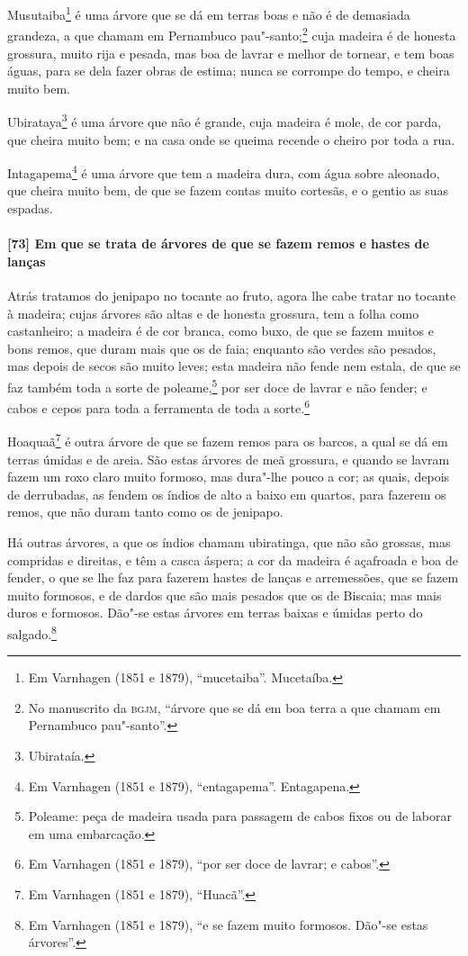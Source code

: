 Musutaiba\footnote{ Em Varnhagen (1851 e 1879), ``mucetaiba''. Mucetaíba.} é uma árvore
que se dá em terras boas e não é de demasiada grandeza, a que chamam em Pernambuco
pau"-santo;\footnote{ No manuscrito da \textsc{bgjm}, ``árvore que se dá em boa terra a que
chamam em Pernambuco pau"-santo''.} cuja madeira é de honesta grossura, muito rija e
pesada, mas boa de lavrar e melhor de tornear, e tem boas águas, para se dela fazer obras
de estima; nunca se corrompe do tempo, e cheira muito bem.

Ubirataya\footnote{ Ubirataía.} é uma árvore que não é grande, cuja madeira é mole, de cor
parda, que cheira muito bem; e na casa onde se queima recende o cheiro por toda a rua.

Intagapema\footnote{ Em Varnhagen (1851 e 1879), ``entagapema''. Entagapena.} é uma árvore
que tem a madeira dura, com água sobre aleonado, que cheira muito bem, de que se fazem
contas muito cortesãs, e o gentio as suas espadas.

\paragraph{[73] Em que se trata de árvores de que se fazem remos e hastes de lanças}\quad
Atrás tratamos do jenipapo no tocante ao fruto, agora lhe cabe tratar no tocante à
madeira; cujas árvores são altas e de honesta grossura, tem a folha como castanheiro; a
madeira é de cor branca, como buxo, de que se fazem muitos e bons remos, que duram mais
que os de faia; enquanto são verdes são pesados, mas depois de secos são muito leves; esta
madeira não fende nem estala, de que se faz também toda a sorte de poleame,\footnote{
Poleame: peça de madeira usada para passagem de cabos fixos ou de laborar em uma
embarcação.} por ser doce de lavrar e não fender; e cabos e cepos para toda a ferramenta
de toda a sorte.\footnote{ Em Varnhagen (1851 e 1879), ``por ser doce de lavrar; e
cabos''.}

Hoaquaã\footnote{ Em Varnhagen (1851 e 1879), ``Huacã''.} é outra árvore de que se fazem
remos para os barcos, a qual se dá em terras úmidas e de areia. São estas árvores de meã
grossura, e quando se lavram fazem um roxo claro muito formoso, mas dura"-lhe pouco a cor;
as quais, depois de derrubadas, as fendem os índios de alto a baixo em quartos, para
fazerem os remos, que não duram tanto como os de jenipapo.

Há outras árvores, a que os índios chamam ubiratinga, que não são grossas, mas compridas e
direitas, e têm a casca áspera; a cor da madeira é açafroada e boa de fender, o que se lhe
faz para fazerem hastes de lanças e arremessões, que se fazem muito formosos, e de dardos
que são mais pesados que os de Biscaia; mas mais duros e formosos. Dão"-se estas árvores em
terras baixas e úmidas perto do salgado.\footnote{ Em Varnhagen (1851 e 1879), ``e se
fazem muito formosos. Dão"-se estas árvores''.}

